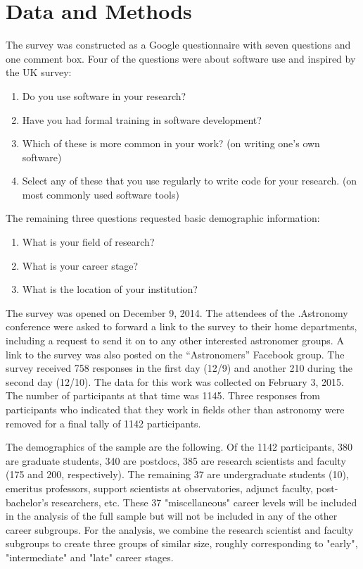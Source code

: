 \section{Data and Methods}
\label{sec:datamethods}

The survey was constructed as a Google questionnaire with seven questions and one comment box. Four of the questions were about software use and inspired by the UK survey:
\begin{enumerate}
\item Do you use software in your research?
\item Have you had formal training in software development?
\item Which of these is more common in your work? (on writing one's own software)
\item Select any of these that you use regularly to write code for your research. (on most commonly used software tools)
\end{enumerate}
The remaining three questions requested basic demographic information:
\begin{enumerate}
\item What is your field of research?
\item What is your career stage?
\item What is the location of your institution?
\end{enumerate}

The survey was opened on December 9, 2014. The attendees of the .Astronomy conference were asked to forward a link to the survey to their home departments, including a request to send it on to any other interested astronomer groups. A link to the survey was also posted on the ``Astronomers'' Facebook group. The survey received 758 responses in the first day (12/9) and another 210 during the second day (12/10). The data for this work was collected on February 3, 2015. The number of participants at that time was 1145. Three responses from participants who indicated that they work in fields other than astronomy were removed for a final tally of 1142 participants. 

The demographics of the sample are the following. Of the 1142 participants, 380 are graduate students, 340 are postdocs, 385 are research scientists and faculty (175 and 200, respectively). The remaining 37 are undergraduate students (10), emeritus professors, support scientists at observatories, adjunct faculty, post-bachelor's researchers, etc. These 37 "miscellaneous" career levels will be included in the analysis of the full sample but will not be included in any of the other career subgroups. For the analysis, we combine the research scientist and faculty subgroups to create three groups of similar size, roughly corresponding to "early", "intermediate" and "late" career stages.

